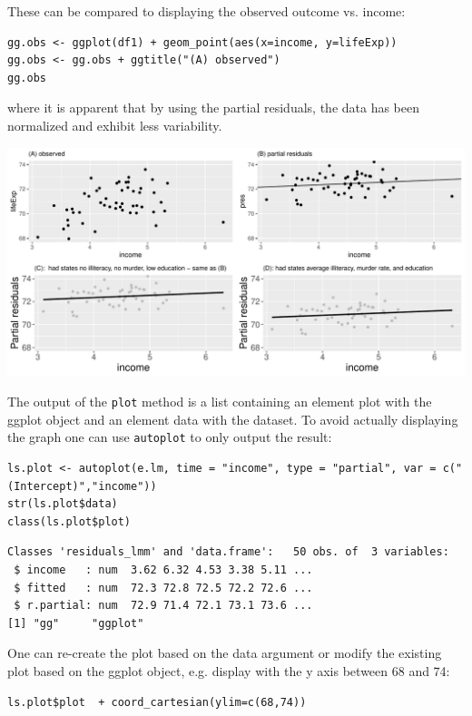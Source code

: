 \documentclass[12pt]{article}
\begin{document}
\clearpage

These can be compared to displaying the observed outcome vs. income:
\lstset{language=r,label= ,caption= ,captionpos=b,numbers=none}
\begin{lstlisting}
gg.obs <- ggplot(df1) + geom_point(aes(x=income, y=lifeExp))
gg.obs <- gg.obs + ggtitle("(A) observed")
gg.obs
\end{lstlisting}

where it is apparent that by using the partial residuals, the data has
been normalized and exhibit less variability.
\begin{center}
\includegraphics[trim={0 0 0 0},width=1\textwidth]{./figures/gg-lmpres-comparisons.pdf}
\end{center}

The output of the \texttt{plot} method is a list containing an element plot
with the ggplot object and an element data with the dataset. To avoid
actually displaying the graph one can use \texttt{autoplot} to only output the result:
\lstset{language=r,label= ,caption= ,captionpos=b,numbers=none}
\begin{lstlisting}
ls.plot <- autoplot(e.lm, time = "income", type = "partial", var = c("(Intercept)","income"))
str(ls.plot$data)
class(ls.plot$plot)
\end{lstlisting}

\begin{verbatim}
Classes 'residuals_lmm' and 'data.frame':	50 obs. of  3 variables:
 $ income   : num  3.62 6.32 4.53 3.38 5.11 ...
 $ fitted   : num  72.3 72.8 72.5 72.2 72.6 ...
 $ r.partial: num  72.9 71.4 72.1 73.1 73.6 ...
[1] "gg"     "ggplot"
\end{verbatim}


One can re-create the plot based on the data argument or modify the
existing plot based on the ggplot object, e.g. display with the y axis
between 68 and 74:
\lstset{language=r,label= ,caption= ,captionpos=b,numbers=none}
\begin{lstlisting}
ls.plot$plot  + coord_cartesian(ylim=c(68,74))
\end{lstlisting}
\end{document}
